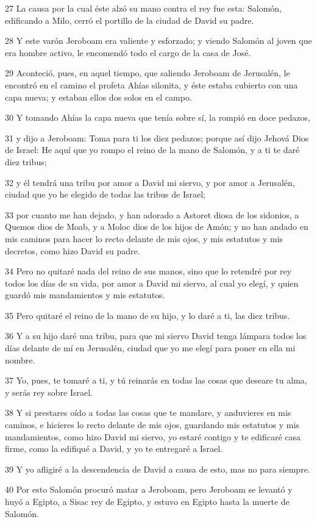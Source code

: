 \par 27 La causa por la cual éste alzó su mano contra el rey fue esta: Salomón, edificando a Milo, cerró el portillo de la ciudad de David su padre.
\par 28 Y este varón Jeroboam era valiente y esforzado; y viendo Salomón al joven que era hombre activo, le encomendó todo el cargo de la casa de José.
\par 29 Aconteció, pues, en aquel tiempo, que saliendo Jeroboam de Jerusalén, le encontró en el camino el profeta Ahías silonita, y éste estaba cubierto con una capa nueva; y estaban ellos dos solos en el campo.
\par 30 Y tomando Ahías la capa nueva que tenía sobre sí, la rompió en doce pedazos,
\par 31 y dijo a Jeroboam: Toma para ti los diez pedazos; porque así dijo Jehová Dios de Israel: He aquí que yo rompo el reino de la mano de Salomón, y a ti te daré diez tribus;
\par 32 y él tendrá una tribu por amor a David mi siervo, y por amor a Jerusalén, ciudad que yo he elegido de todas las tribus de Israel;
\par 33 por cuanto me han dejado, y han adorado a Astoret diosa de los sidonios, a Quemos dios de Moab, y a Moloc dios de los hijos de Amón; y no han andado en mis caminos para hacer lo recto delante de mis ojos, y mis estatutos y mis decretos, como hizo David su padre.
\par 34 Pero no quitaré nada del reino de sus manos, sino que lo retendré por rey todos los días de su vida, por amor a David mi siervo, al cual yo elegí, y quien guardó mis mandamientos y mis estatutos.
\par 35 Pero quitaré el reino de la mano de su hijo, y lo daré a ti, las diez tribus.
\par 36 Y a su hijo daré una tribu, para que mi siervo David tenga lámpara todos los días delante de mí en Jerusalén, ciudad que yo me elegí para poner en ella mi nombre.
\par 37 Yo, pues, te tomaré a ti, y tú reinarás en todas las cosas que deseare tu alma, y serás rey sobre Israel.
\par 38 Y si prestares oído a todas las cosas que te mandare, y anduvieres en mis caminos, e hicieres lo recto delante de mis ojos, guardando mis estatutos y mis mandamientos, como hizo David mi siervo, yo estaré contigo y te edificaré casa firme, como la edifiqué a David, y yo te entregaré a Israel.
\par 39 Y yo afligiré a la descendencia de David a causa de esto, mas no para siempre.
\par 40 Por esto Salomón procuró matar a Jeroboam, pero Jeroboam se levantó y huyó a Egipto, a Sisac rey de Egipto, y estuvo en Egipto hasta la muerte de Salomón.

